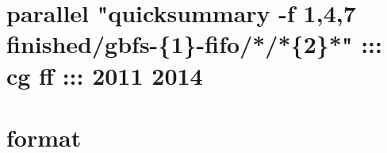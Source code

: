 \section{parallel "quicksummary -f 1,4,7 finished/gbfs-\{1\}-fifo/*/*\{2\}*" ::: cg ff ::: 2011 2014}
\label{sec-1}

\section{}
\label{sec-2}

\section{format}
\label{sec-3}
